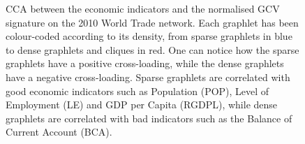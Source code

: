 \begin{figure}[H]
\begin{subfigure}{.65\textwidth}
  \end{subfigure}
  \begin{subfigure}{.25\textwidth}
    \centering 
	
    \gtwelve
    \gten
    \gfourteen
    \gdots
    \gtwo
    \gtwentynine
    \geight

  \end{subfigure}
  
\caption[CCA - World Trade networks - normalised GCV]{CCA between the economic indicators and the normalised GCV signature on the 2010 World Trade network. Each graphlet has been colour-coded according to its density, from sparse graphlets in blue to dense graphlets and cliques in red. One can notice how the sparse graphlets have a positive cross-loading, while the dense graphlets have a negative cross-loading. Sparse graphlets are correlated with good economic indicators such as Population (POP), Level of Employment (LE) and GDP per Capita (RGDPL), while dense graphlets are correlated with bad indicators such as the Balance of Current Account (BCA).}
\label{all_trade_thresh_cca}
\end{figure}


